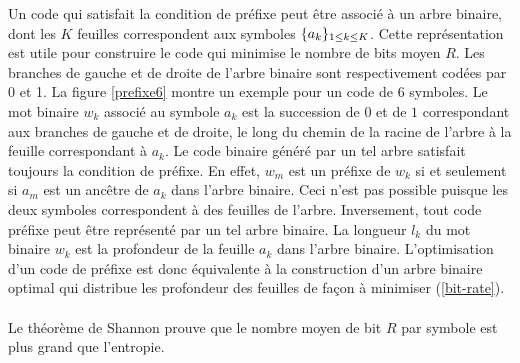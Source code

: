 Un code qui satisfait la condition de pr\'efixe peut \^etre
associ\'e \`a un arbre binaire, dont les $K$ feuilles correspondent
aux symboles $\{a_k \}_{ 1 \leq k \leq K}$.
Cette repr\'esentation est utile pour construire le code
qui minimise le nombre de bits moyen $R$.
Les branches de gauche et de droite de l'arbre binaire sont
respectivement cod\'ees par 0 et 1.
La figure \ref{prefixe6} montre un exemple pour un code
de $6$ symboles.
Le mot binaire $w_k$ associ\'e au symbole $a_k$
est la succession de $0$ et de $1$ correspondant aux branches
de gauche et de droite, le long du chemin de la racine de
l'arbre \`a la feuille correspondant \`a $a_k$.
Le code binaire g\'en\'er\'e par un tel arbre satisfait toujours
la condition de pr\'efixe. En effet, $w_m$ est
un pr\'efixe de $w_k$ si et seulement si
$a_m$ est un anc\^etre de $a_k$ dans l'arbre binaire.
Ceci n'est pas possible puisque les deux symboles correspondent
\`a des feuilles de l'arbre.
Inversement, tout code pr\'efixe peut \^etre repr\'esent\'e par un tel
arbre binaire.
La longueur $l_k$ du mot binaire
$w_k$ est la profondeur de la feuille $a_k$ dans l'arbre binaire.
L'optimisation d'un code de pr\'efixe est donc \'equivalente \`a
la construction d'un arbre binaire optimal qui distribue
les profondeur des feuilles de fa\c con \`a minimiser
(\ref{bit-rate}).
\\
\\
Le th\'eor\`eme de Shannon prouve que le nombre moyen de bit $R$
par symbole est plus grand que l'entropie.

